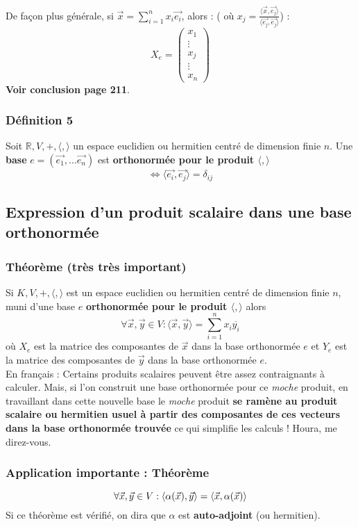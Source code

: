 \documentclass[12pt, a4paper]{article}
\begin{document}
De façon plus générale, si $\vec{x} = \sum_{i=1}^n x_i\vec{e_i}$, alors : ( où $x_j = \frac{\langle\vec{x}, \vec{e_j} \rangle}{\langle\vec{e_j}, \vec{e_j}\rangle}$) :
$$X_e = \begin{pmatrix} 
x_1\\
\vdots\\ 
x_j\\
\vdots\\
x_n \end{pmatrix}$$
\textbf{Voir conclusion page 211}.

\subsubsection*{Définition 5}
Soit $\mathbb{R}, V, +, \langle , \rangle$ un espace euclidien ou hermitien centré de dimension finie $n$. Une \textbf{base} $e = (\vec{e_1}, ... \vec{e_n})$ est \textbf{orthonormée pour le produit $\langle , \rangle$}
$$\Leftrightarrow \langle\vec{e_i}, \vec{e_j}\rangle = \delta_{ij}$$

\subsection{Expression d'un produit scalaire dans une base orthonormée}
\subsubsection{Théorème (très très important)}
Si $K , V, +, \langle , \rangle$ est un espace euclidien ou hermitien centré de dimension finie $n$, muni d'une base $e$ \textbf{orthonormée pour le produit $\langle , \rangle$} alors 
$$\forall \vec{x}, \vec{y} \in V : \langle \vec{x}, \vec{y}\rangle = \sum_{i=1}^n x_i\overline{y_i}$$
où $X_e$ est la matrice des composantes de $\vec{x}$ dans la base orthonormée $e$ et $Y_e$ est la matrice des composantes de $\vec{y}$ dans la base orthonormée $e$.\\

En français : Certains produits scalaires peuvent être assez contraignants à calculer. Mais, si l'on construit une base orthonormée pour ce \textit{moche} produit, en travaillant dans cette nouvelle base le \textit{moche} produit \textbf{se ramène au produit scalaire ou hermitien usuel à partir des composantes de ces vecteurs dans la base orthonormée trouvée} ce qui simplifie les calculs ! Houra, me direz-vous.


\subsubsection*{Application importante : Théorème}
$$\forall \vec{x}, \vec{y} \in V : \pscal{\alpha(\vec{x})}{\vec{y}} = \pscal{\vec{x}}{\alpha(\vec{x})}$$
Si ce théorème est vérifié, on dira que $\alpha$ est \textbf{auto-adjoint} (ou hermitien).
\end{document}
